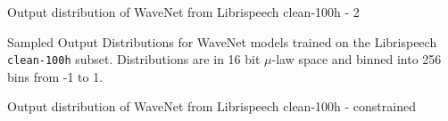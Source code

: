 \documentclass[
  ignorenonframetext,
  aspectratio=169,
]{beamer}
\begin{document}
\begin{frame}[fragile]{Output distribution of WaveNet from Librispeech
clean-100h - 2}
\protect\hypertarget{output-distribution-of-wavenet-from-librispeech-clean-100h---2}{}
\begin{figure}
\end{figure}

Sampled Output Distributions for WaveNet models trained on the
Librispeech \texttt{clean-100h} subset. Distributions are in 16 bit
\(\mu\)-law space and binned into 256 bins from -1 to 1.
\end{frame}

\begin{frame}{Output distribution of WaveNet from Librispeech clean-100h
- constrained}
\protect\hypertarget{output-distribution-of-wavenet-from-librispeech-clean-100h---constrained}{}
\begin{figure}
\end{figure}
\end{frame}
\end{document}
